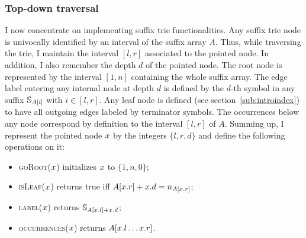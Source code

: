 \subsubsection{Top-down traversal}

I now concentrate on implementing suffix trie functionalities.
Any suffix trie node is univocally identified by an interval of the suffix array $A$.
Thus, while traversing the trie, I maintain the interval $[l,r]$ associated to the pointed node.
In addition, I also remember the depth $d$ of the pointed node.
The root node is represented by the interval $[1,n]$ containing the whole suffix array.
The edge label entering any internal node at depth $d$ is defined by the $d$-th symbol in any suffix $\mathbb {S}_{A[i]}$ with $i \in [l,r]$.
Any leaf node is defined (see section~\ref{sub:introindex}) to have all outgoing edges labeled by terminator symbols.
The occurrences below any node correspond by definition to the interval $[l,r]$ of $A$.
Summing up, I represent the pointed node $x$ by the integers $\{ l, r ,d \}$ and define the following operations on it:
\begin{itemize}
\item \textsc{goRoot}($x$) initializes $x$ to $\{ 1, n, 0\}$;
\item \textsc{isLeaf}($x$) returns true iff $A[x.r] + x.d = n_{A[x.r]}$;
\item \textsc{label}($x$) returns $\mathbb {S}_{A[x.l] + x.d}$;
\item \textsc{occurrences}($x$) returns $A[x.l \dots x.r]$.
\end{itemize}

